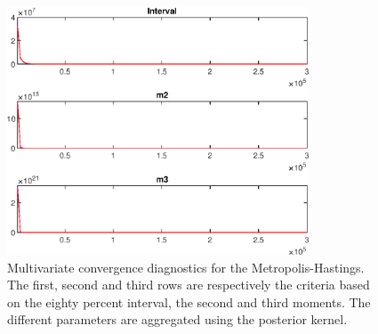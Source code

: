  
\begin{figure}[H]
\centering 
\includegraphics[width=0.8\textwidth]{BRS_sectoral_wo_demand_shocks/Output/BRS_sectoral_wo_demand_shocks_mdiag}
\caption{Multivariate convergence diagnostics for the Metropolis-Hastings.
The first, second and third rows are respectively the criteria based on
the eighty percent interval, the second and third moments. The different 
parameters are aggregated using the posterior kernel.}\label{Fig:MultivariateDiagnostics}
\end{figure}

